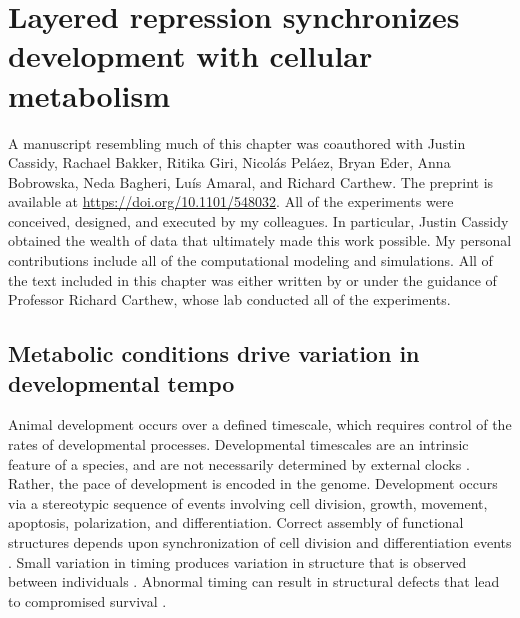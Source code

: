 \graphicspath{ {figures/metabolism/} }


\chapter{Layered repression synchronizes development with cellular metabolism}
\label{ch:metabolism}

A manuscript resembling much of this chapter was coauthored with Justin Cassidy, Rachael Bakker, Ritika Giri, Nicol\'{a}s Pel\'{a}ez, Bryan Eder, Anna Bobrowska, Neda Bagheri, Lu\'{i}s Amaral, and Richard Carthew. The preprint is available at \url{https://doi.org/10.1101/548032}. All of the experiments were conceived, designed, and executed by my colleagues. In particular, Justin Cassidy obtained the wealth of data that ultimately made this work possible. My personal contributions include all of the computational modeling and simulations. All of the text included in this chapter was either written by or under the guidance of Professor Richard Carthew, whose lab conducted all of the experiments.


\section{Metabolic conditions drive variation in developmental tempo}

Animal development occurs over a defined timescale, which requires control of the rates of developmental processes. Developmental timescales are an intrinsic feature of a species, and are not necessarily determined by external clocks \cite{Ebisuya2018}. Rather, the pace of development is encoded in the genome. Development occurs via a stereotypic sequence of events involving cell division, growth, movement, apoptosis, polarization, and differentiation. Correct assembly of functional structures depends upon synchronization of cell division and differentiation events \cite{Foe1989,Sulston1983}. Small variation in timing produces variation in structure that is observed between individuals \cite{Francesconi2014,Poullet2016}. Abnormal timing can result in structural defects that lead to compromised survival \cite{Moss2007}.

